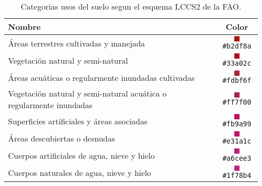 \begin{frame}{}
  \begin{table}[hbt]
      \centering
      \begin{tabular}{p{12cm}c}
          \toprule
          Nombre & Color \\
          \midrule
          Áreas terrestres cultivadas y manejada & \textcolor{A11}{$\blacksquare$}\texttt{\#b2df8a}
          \\
          Vegetación natural y semi-natural  & \textcolor{A12}{$\blacksquare$}\texttt{\#33a02c}\\
          Áreas acuáticas o regularmente inundadas cultivadas &
          \textcolor{A23}{$\blacksquare$}\texttt{\#fdbf6f}\\
          Vegetación natural y semi-natural acuática o
  	regularmente inundadas  & \textcolor{A24}{$\blacksquare$}\texttt{\#ff7f00}\\
          Superficies artificiales y áreas asociadas  &
          \textcolor{B15}{$\blacksquare$}\texttt{\#fb9a99}\\
          Áreas descubiertas o desnudas  & \textcolor{B16}{$\blacksquare$}\texttt{\#e31a1c}\\
          Cuerpos artificiales de agua, nieve y hielo  &
          \textcolor{B27}{$\blacksquare$}\texttt{\#a6cee3}\\
          Cuerpos naturales de agua, nieve y hielo &
          \textcolor{B28}{$\blacksquare$}\texttt{\#1f78b4}\\
          \bottomrule
      \end{tabular}
  \caption{\label{tab:usos}Categorias usos del suelo segun el esquema LCCS2 de la FAO.}
  \end{table}
\end{frame}




\gracias
